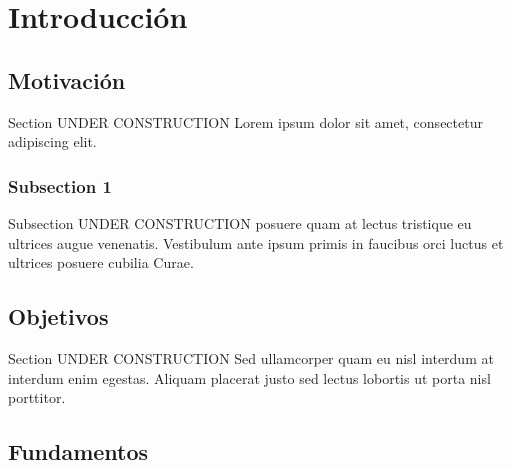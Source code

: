 
\chapter{Introducción} %

\label{Chapter1} %


\section{Motivación}

Section UNDER CONSTRUCTION Lorem ipsum dolor sit amet, consectetur adipiscing elit.\cite{REF}

\subsection{Subsection 1}

Subsection UNDER CONSTRUCTION posuere quam at lectus tristique eu ultrices augue venenatis. Vestibulum ante ipsum primis in faucibus orci luctus et ultrices posuere cubilia Curae.



\section{Objetivos}

Section UNDER CONSTRUCTION Sed ullamcorper quam eu nisl interdum at interdum enim egestas. Aliquam placerat justo sed lectus lobortis ut porta nisl porttitor.


\section{Fundamentos}

